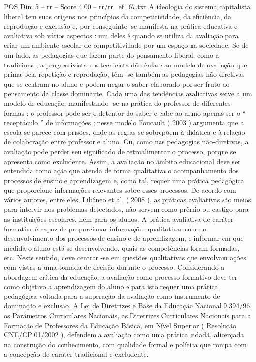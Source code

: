 \begin{textsample}{POS Dim 5 – rr – Score 4.00 – rr/rr\_ef\_67.txt}
A ideologia do sistema capitalista liberal tem suas origens nos princípios da competitividade, da eficiência, da reprodução e exclusão e, por conseguinte, se manifesta na prática educativa e avaliativa sob vários aspectos : um deles é quando se utiliza da avaliação para criar um ambiente escolar de competitividade por um espaço na sociedade.
Se de um lado, as pedagogias que fazem parte do pensamento liberal, como a tradicional, a progressivista e a tecnicista dão ênfase ao modelo de avaliação que prima pela repetição e reprodução, têm -se também as pedagogias não-diretivas que se centram no aluno e podem negar o saber elaborado por ser fruto do pensamento da classe dominante.
Cada uma das tendências avaliativas serve a um modelo de educação, manifestando -se na prática do professor de diferentes formas : o professor pode ser o detentor do saber e cabe ao aluno apenas ser o “ receptáculo ” de informações ; nesse modelo Foucault ( 2003 ) argumenta que a escola se parece com prisões, onde as regras se sobrepõem à didática e à relação de colaboração entre professor e aluno.
Ou, como nas pedagogias não-diretivas, a avaliação pode perder seu significado de retroalimentar o processo, porque se apresenta como excludente.
Assim, a avaliação no âmbito educacional deve ser entendida como ação que atenda de forma qualitativa o acompanhamento dos processos de ensino e aprendizagem e, como tal, requer uma prática pedagógica que proporcione informações relevantes sobre esses processos.
De acordo com vários autores, entre eles, Libâneo et al. ( 2008 ), as práticas avaliativas são meios para intervir nos problemas detectados, não servem como prêmio ou castigo para as instituições escolares, nem para os alunos.
A prática avaliativa de caráter formativo é capaz de proporcionar informações qualitativas sobre o desenvolvimento dos processos de ensino e de aprendizagem, e informar em que medida o aluno está se desenvolvendo, quais as competências foram formadas, etc.
Neste sentido, deve centrar -se em questões qualitativas que envolvam ações com vistas a uma tomada de decisão durante o processo.
Considerando a abordagem crítica da educação, a avaliação como processo formativo deve ter como objetivo a aprendizagem do aluno e para isto requer uma prática pedagógica voltada para a superação da avaliação como instrumento de dominação e exclusão.
A Lei de Diretrizes e Base da Educação Nacional 9.394/96, os Parâmetros Curriculares Nacionais, as Diretrizes Curriculares Nacionais para a Formação de Professores da Educação Básica, em Nível Superior ( Resolução CNE/CP 01/2002 ), defendem a avaliação como uma prática cidadã, alicerçada na construção do conhecimento, com qualidade formal e política que rompa com a concepção de caráter tradicional e excludente.

\end{textsample}
